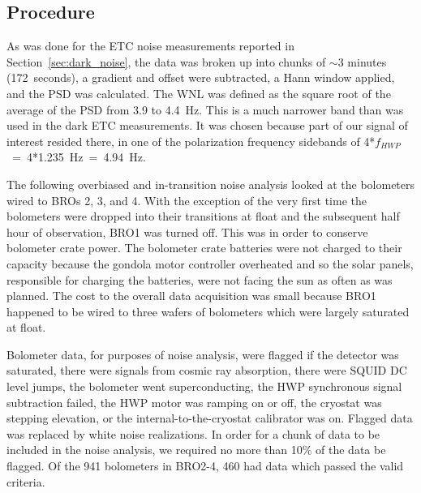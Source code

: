 \subsection{Procedure}
\label{sec:flight_procedure}



As was done for the \ac{ETC} noise measurements reported in Section~\ref{sec:dark_noise}, the data was broken up into chunks of $\sim$3 minutes (172~seconds),
a gradient and offset were subtracted, a Hann window applied, and the \ac{PSD} was calculated. 
The \ac{WNL} was defined as the square root of the average of the \ac{PSD} from 3.9 to 4.4~Hz. 
This is a much narrower band than was used in the dark \ac{ETC} measurements. 
It was chosen because part of our signal of interest resided there, in one of the polarization frequency sidebands of 4*$f_{HWP}$~=~4*1.235~Hz~=~4.94~Hz. 

The following overbiased and in-transition noise analysis looked at the bolometers wired to \ac{BRO}s 2, 3, and 4. 
With the exception of the very first time the bolometers were dropped into their transitions at float and the subsequent half hour of observation, \ac{BRO}1 was turned off. 
This was in order to conserve bolometer crate power.
The bolometer crate batteries were not charged to their capacity because the gondola motor controller overheated and so the solar panels, responsible for charging the batteries, were not facing the sun as often as was planned. 
The cost to the overall data acquisition was small because \ac{BRO}1 happened to be wired to three wafers of bolometers which were largely saturated at float. 

Bolometer data, for purposes of noise analysis, were flagged if the detector was saturated, there were signals from cosmic ray absorption, there were \ac{SQUID} DC level jumps, the bolometer went superconducting, the \ac{HWP} synchronous signal subtraction failed, the \ac{HWP} motor was ramping on or off, the cryostat was stepping elevation, or the internal-to-the-cryostat calibrator was on. 
Flagged data was replaced by white noise realizations. 
In order for a chunk of data to be included in the noise analysis, we required no more than 10\% of the data be flagged. 
Of the 941 bolometers in \ac{BRO}2-4, 460 had data which passed the valid criteria. 

